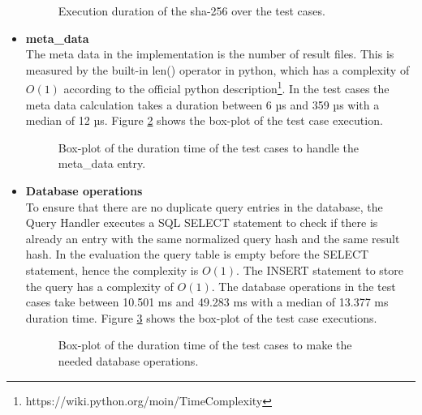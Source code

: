 \documentclass[draft,final]{vutinfth} %
\begin{document}
\begin{itemize}
\begin{figure}[h]
	\caption{Execution duration of the sha-256 over the test cases.}
	\label{fig:evaluation_impact_data_resulthash} %
\end{figure}
	\item \textbf{meta\_data} \\
	The meta data in the implementation is the number of result files. This is measured by the built-in len() operator in python, which has a complexity of $O(1)$ according to the official python description\footnote{https://wiki.python.org/moin/TimeComplexity}. In the test cases the meta data calculation takes a duration between 6 µs and 359 µs with a median of 12 µs. Figure \ref{fig:evaluation_perf_meta_data} shows the box-plot of the test case execution.
\begin{figure}[!h]
	\centering
	\caption{Box-plot of the duration time of the test cases to handle the meta\_data entry.}
	\label{fig:evaluation_perf_meta_data}	
\end{figure}
	\item \textbf{Database operations} \\
	To ensure that there are no duplicate query entries in the database, the Query Handler executes a SQL SELECT statement to check if there is already an entry with the same normalized query hash and the same result hash. In the evaluation the query table is empty before the SELECT statement, hence the complexity is $O(1)$. The INSERT statement to store the query has a complexity of $O(1)$. The database operations in the test cases take between 10.501 ms and 49.283 ms with a median of 13.377 ms duration time. Figure \ref{fig:evaluation_perf_data_database} shows the box-plot of the test case executions.  
\begin{figure}[!h]
	\centering
	\caption{Box-plot of the duration time of the test cases to make the needed database operations.}
	\label{fig:evaluation_perf_data_database}	
\end{figure}
\end{itemize}
\end{document}
